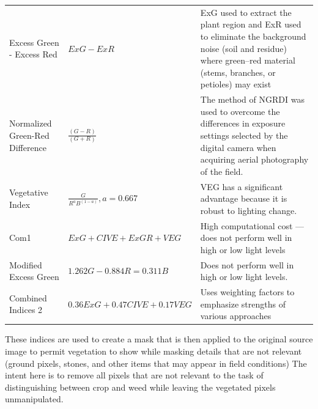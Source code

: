 \documentclass[letterpaper]{article}
\begin{document}
{{{\begin{longtable}{x{\dimexpr.25\tabcolsep}
                  x{\dimexpr.35\tabcolsep}
                  x{\dimexpr.4\tabcolsep}}
		Excess Green - Excess Red   
		& $ExG - ExR$ 
		& ExG used to extract the plant region and ExR used to eliminate the background noise (soil and residue) where green–red material (stems, branches, or petioles) may exist
\tabularnewline\addlinespace

		Normalized Green-Red Difference    
		& $\frac {(G - R)} {(G + R)}$ 
		& The method of NGRDI was used to overcome the differences in exposure settings selected by the digital camera when acquiring aerial photography of the field. 
\tabularnewline\addlinespace

		Vegetative Index      
		& $\frac {G} {R^aB^{(1-a)}}, a = 0.667$ 
		& VEG has a significant advantage because it is robust to lighting change.
\tabularnewline\addlinespace

		Com1   
		& $ExG + CIVE + ExGR + VEG$ 
		& High computational cost --- does not perform well in high or low light levels
\tabularnewline\addlinespace

		Modified Excess Green      
		& $1.262G - 0.884R = 0.311B$ 
		& Does not perform well in high or low light levels. 
\tabularnewline\addlinespace

		Combined Indices 2      
		& $0.36ExG + 0.47CIVE + 0.17VEG$ 
		& Uses weighting factors to emphasize strengths of various approaches
\label{table:segmentation}
\end{longtable}
}


These indices are used to create a mask that is then applied to the original source image to permit vegetation to show while masking details that are not relevant (ground pixels, stones, and other items that may appear in field conditions) The intent here is to remove all pixels that are not relevant to the task of distinguishing between crop and weed while leaving the vegetated pixels unmanipulated.

}}
\end{document}
